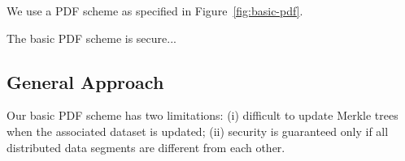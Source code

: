 We use a PDF scheme as specified in Figure~\ref{fig:basic-pdf}.

\begin{Lem}
The basic PDF scheme is secure... 
\end{Lem}

\subsection{General Approach} \label{sect:pdf-general}

Our basic PDF scheme has two limitations: (i) difficult to update Merkle trees when the associated dataset is updated; (ii) security is guaranteed only if all distributed data segments are different from each other.
